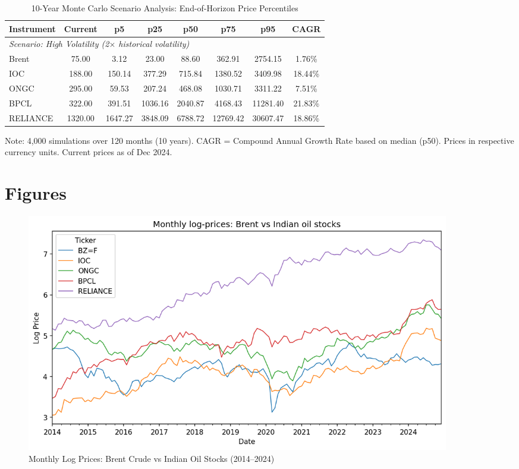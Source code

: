 \documentclass[11pt]{article}
\begin{document}
\begin{table}[htbp]
\centering
\caption{10-Year Monte Carlo Scenario Analysis: End-of-Horizon Price Percentiles}
\label{tab:scenario}
\begin{tabular}{lccccccc}
\toprule
\textbf{Instrument} & \textbf{Current} & \textbf{p5} & \textbf{p25} & \textbf{p50} & \textbf{p75} & \textbf{p95} & \textbf{CAGR} \\
\midrule
\multicolumn{8}{l}{\textit{Scenario: High Volatility (2$\times$ historical volatility)}} \\
\midrule
Brent     & 75.00  & 3.12   & 23.00  & 88.60  & 362.91 & 2754.15 & 1.76\% \\
IOC       & 188.00 & 150.14 & 377.29 & 715.84 & 1380.52 & 3409.98 & 18.44\% \\
ONGC      & 295.00 & 59.53  & 207.24 & 468.08 & 1030.71 & 3311.22 & 7.51\% \\
BPCL      & 322.00 & 391.51 & 1036.16 & 2040.87 & 4168.43 & 11281.40 & 21.83\% \\
RELIANCE  & 1320.00 & 1647.27 & 3848.09 & 6788.72 & 12769.42 & 30607.47 & 18.86\% \\
\bottomrule
\end{tabular}
\begin{tablenotes}
\small
\item Note: 4,000 simulations over 120 months (10 years). CAGR = Compound Annual Growth Rate based on median (p50). Prices in respective currency units. Current prices as of Dec 2024.
\end{tablenotes}
\end{table}

\clearpage
\section*{Figures}

\begin{figure}[htbp]
\centering
\includegraphics[width=0.9\textwidth]{prices_log_trend.png}
\caption{Monthly Log Prices: Brent Crude vs Indian Oil Stocks (2014--2024)}
\label{fig:prices}
\end{figure}
\end{document}
